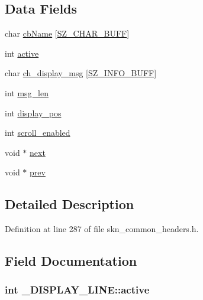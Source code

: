 \subsection*{Data Fields}
\begin{DoxyCompactItemize}
\item 
char \hyperlink{struct___d_i_s_p_l_a_y___l_i_n_e_a3a374d209578adb1d4cea933756fb14a}{cb\+Name} \mbox{[}\hyperlink{skn__common__headers_8h_a8d2978ad614b0de81c60483e706d9306}{S\+Z\+\_\+\+C\+H\+A\+R\+\_\+\+B\+U\+FF}\mbox{]}
\item 
int \hyperlink{struct___d_i_s_p_l_a_y___l_i_n_e_acf235d7965b9d52439add787b8e3d316}{active}
\item 
char \hyperlink{struct___d_i_s_p_l_a_y___l_i_n_e_ae5fae9b599281d1d3f619b6e402e7c2c}{ch\+\_\+display\+\_\+msg} \mbox{[}\hyperlink{skn__common__headers_8h_a442d5e93bd9c9d8eb4532aba62b5f86c}{S\+Z\+\_\+\+I\+N\+F\+O\+\_\+\+B\+U\+FF}\mbox{]}
\item 
int \hyperlink{struct___d_i_s_p_l_a_y___l_i_n_e_aa9cfa1dd3e90386f675fef61e711342e}{msg\+\_\+len}
\item 
int \hyperlink{struct___d_i_s_p_l_a_y___l_i_n_e_af32b1aa2ce817c27695d7cd43db9364d}{display\+\_\+pos}
\item 
int \hyperlink{struct___d_i_s_p_l_a_y___l_i_n_e_ad92346a9708f3f3ba0c45dfb891c18e3}{scroll\+\_\+enabled}
\item 
void $\ast$ \hyperlink{struct___d_i_s_p_l_a_y___l_i_n_e_a0668a4de4eb91d9bbd03cc52b00f4fd0}{next}
\item 
void $\ast$ \hyperlink{struct___d_i_s_p_l_a_y___l_i_n_e_aadc57636aadef3cff11443217e7f50e5}{prev}
\end{DoxyCompactItemize}


\subsection{Detailed Description}


Definition at line 287 of file skn\+\_\+common\+\_\+headers.\+h.



\subsection{Field Documentation}
\subsubsection[{\texorpdfstring{active}{active}}]{\setlength{\rightskip}{0pt plus 5cm}int \+\_\+\+D\+I\+S\+P\+L\+A\+Y\+\_\+\+L\+I\+N\+E\+::active}\hypertarget{struct___d_i_s_p_l_a_y___l_i_n_e_acf235d7965b9d52439add787b8e3d316}{}\label{struct___d_i_s_p_l_a_y___l_i_n_e_acf235d7965b9d52439add787b8e3d316}


